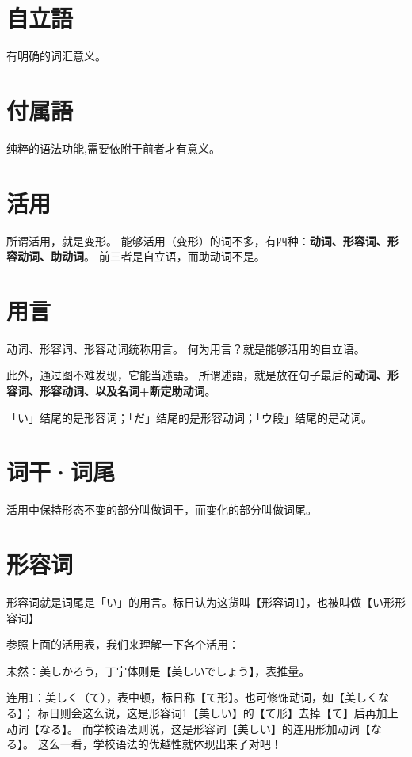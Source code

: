 \section{自立語}

有明确的词汇意义。

\section{付属語}

纯粹的语法功能,需要依附于前者才有意义。

\section{活用}

所谓活用，就是变形。
能够活用（变形）的词不多，有四种：\textbf{动词、形容词、形容动词、助动词}。
前三者是自立语，而助动词不是。

\section{用言}

动词、形容词、形容动词统称用言。
何为用言？就是能够活用的自立语。

此外，通过图不难发现，它能当述語。
所谓述語，就是放在句子最后的\textbf{动词、形容词、形容动词、以及名词+断定助动词}。

「い」结尾的是形容词；「だ」结尾的是形容动词；「ウ段」结尾的是动词。

\section{词干·词尾}

活用中保持形态不变的部分叫做词干，而变化的部分叫做词尾。

\section{形容词}

形容词就是词尾是「い」的用言。标日认为这货叫【形容词1】，也被叫做【い形形容词】

参照上面的活用表，我们来理解一下各个活用：

未然：美しかろう，丁宁体则是【美しいでしょう】，表推量。

连用1：美しく（て），表中顿，标日称【て形】。也可修饰动词，如【美しくなる】；
    标日则会这么说，这是形容词1【美しい】的【て形】去掉【て】后再加上动词【なる】。
    而学校语法则说，这是形容词【美しい】的连用形加动词【なる】。
    这么一看，学校语法的优越性就体现出来了对吧！

